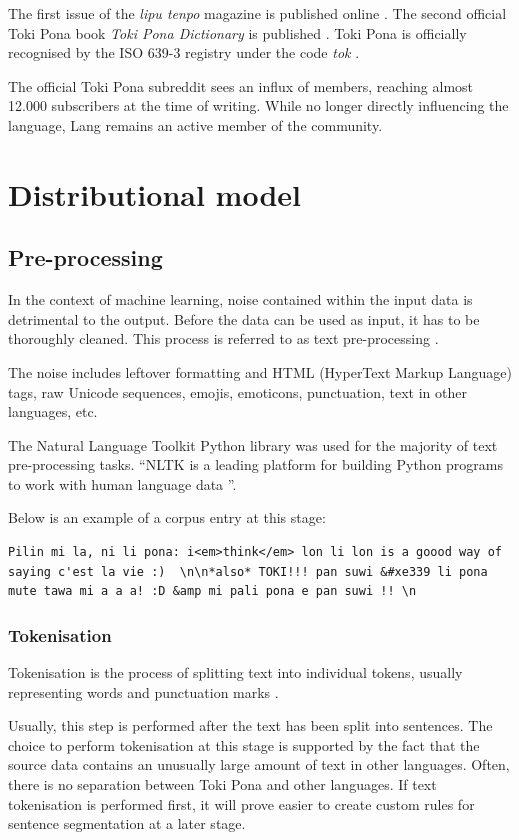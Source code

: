 \documentclass[14pt, a4paper]{extreport}
\begin{document}
The first issue of the \textit{lipu tenpo} magazine is published online \parencite{liputenpo}. The second official Toki Pona book \textit{Toki Pona Dictionary} is published \parencite{ku}. Toki Pona is officially recognised by the ISO 639-3 registry under the code \textit{tok} \parencite{isoproof}.

The official Toki Pona subreddit sees an influx of members, reaching almost 12.000 subscribers at the time of writing. While no longer directly influencing the language, Lang remains an active member of the community.

  \section{Distributional model}
    \subsection{Pre-processing}
In the context of machine learning, noise contained within the input data is detrimental to the output. Before the data can be used as input, it has to be thoroughly cleaned. This process is referred to as text pre-processing \parencite[49]{vajjala}.

The noise includes leftover formatting and HTML (HyperText Markup Language) tags, raw Unicode sequences, emojis, emoticons, punctuation, text in other languages, etc.

The Natural Language Toolkit Python library was used for the majority of text pre-processing tasks. ``NLTK is a leading platform for building Python programs to work with human language data \parencite{nltk}''.

Below is an example of a corpus entry at this stage:

\begin{lstlisting}
Pilin mi la, ni li pona: i<em>think</em> lon li lon is a goood way of saying c'est la vie :)  \n\n*also* TOKI!!! pan suwi &#xe339 li pona mute tawa mi a a a! :D &amp mi pali pona e pan suwi !! \n
\end{lstlisting}
      \subsubsection{Tokenisation}
Tokenisation is the process of splitting text into individual tokens, usually representing words and punctuation marks \parencite[49]{vajjala}.

Usually, this step is performed after the text has been split into sentences. The choice to perform tokenisation at this stage is supported by the fact that the source data contains an unusually large amount of text in other languages. Often, there is no separation between Toki Pona and other languages. If text tokenisation is performed first, it will prove easier to create custom rules for sentence segmentation at a later stage.
\end{document}

